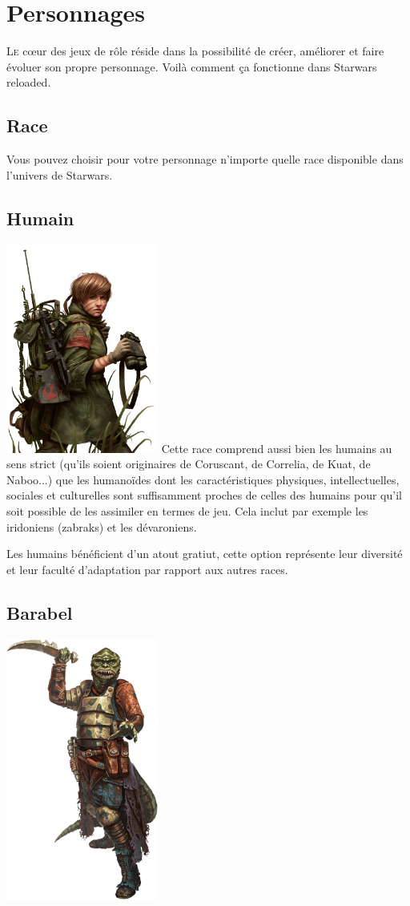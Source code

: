 
\section{Personnages}
\lettrine{L}{e} c\oe{}ur des jeux de rôle réside dans la possibilité de créer, améliorer et faire évoluer son propre personnage. Voilà comment ça fonctionne dans {\jedifont Starwars reloaded}. 

\subsection{Race}
Vous pouvez choisir pour votre personnage n’importe quelle race disponible dans l'univers de Starwars. 

\subsection{Humain}
\includegraphics[width=5cm]{img/races/humain.png}
Cette race comprend aussi bien les humains au sens strict (qu’ils soient originaires de Coruscant, de Correlia, de Kuat, de Naboo...) que les humanoïdes dont les caractéristiques physiques, intellectuelles, sociales et culturelles sont suffisamment proches de celles des humains pour qu’il soit possible de les assimiler en termes de jeu. Cela inclut par exemple les iridoniens (zabraks) et les dévaroniens.

Les humains bénéficient d'un atout gratiut, cette option représente leur diversité et leur faculté d’adaptation par rapport aux autres races.

\subsection{Barabel}
\includegraphics[width=5cm, right]{img/races/barabel.png}

